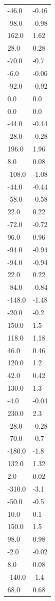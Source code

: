 \begin{longtable}{ll}
-46.0 & -0.46 \\
-98.0 & -0.98 \\
162.0 & 1.62 \\
28.0 & 0.28 \\
-70.0 & -0.7 \\
-6.0 & -0.06 \\
-92.0 & -0.92 \\
0.0 & 0.0 \\
0.0 & 0.0 \\
-44.0 & -0.44 \\
-28.0 & -0.28 \\
196.0 & 1.96 \\
8.0 & 0.08 \\
-108.0 & -1.08 \\
-44.0 & -0.44 \\
-58.0 & -0.58 \\
22.0 & 0.22 \\
-72.0 & -0.72 \\
96.0 & 0.96 \\
-94.0 & -0.94 \\
-94.0 & -0.94 \\
22.0 & 0.22 \\
-84.0 & -0.84 \\
-148.0 & -1.48 \\
-20.0 & -0.2 \\
150.0 & 1.5 \\
118.0 & 1.18 \\
46.0 & 0.46 \\
120.0 & 1.2 \\
42.0 & 0.42 \\
130.0 & 1.3 \\
-4.0 & -0.04 \\
230.0 & 2.3 \\
-28.0 & -0.28 \\
-70.0 & -0.7 \\
-180.0 & -1.8 \\
132.0 & 1.32 \\
2.0 & 0.02 \\
-310.0 & -3.1 \\
-50.0 & -0.5 \\
10.0 & 0.1 \\
150.0 & 1.5 \\
98.0 & 0.98 \\
-2.0 & -0.02 \\
8.0 & 0.08 \\
-140.0 & -1.4 \\
68.0 & 0.68 \\

\end{longtable}
